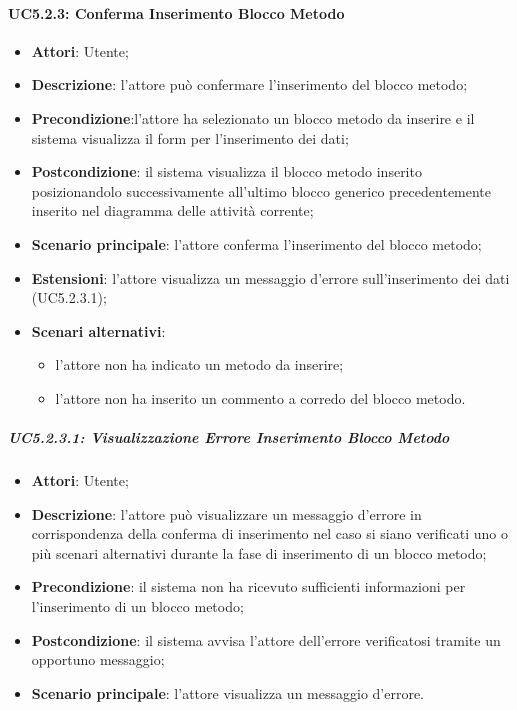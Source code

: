 \paragraph{UC5.2.3: Conferma Inserimento Blocco Metodo}
\label{UC5.2.3}
\begin{itemize}
\item \textbf{Attori}: Utente;
\item \textbf{Descrizione}: l'attore può confermare l'inserimento del blocco metodo;	
\item \textbf{Precondizione}:l'attore ha selezionato un blocco metodo da inserire e il sistema visualizza il form per l'inserimento dei dati;	
\item \textbf{Postcondizione}: il sistema visualizza il blocco metodo inserito posizionandolo successivamente all'ultimo blocco generico precedentemente inserito nel diagramma delle attività corrente;		
\item \textbf{Scenario principale}:
l'attore conferma l'inserimento del blocco metodo;	
\item \textbf{Estensioni}:
l'attore visualizza un messaggio d'errore sull'inserimento dei dati (UC5.2.3.1);	
\item \textbf{Scenari alternativi}:
\begin{itemize}
\item l'attore non ha indicato un metodo da inserire;
\item l'attore non ha inserito un commento a corredo del blocco metodo.
\end{itemize}
\end{itemize}

\subparagraph{UC5.2.3.1: Visualizzazione Errore Inserimento Blocco Metodo}
\label{UC5.2.3.1}
\begin{itemize}
\item \textbf{Attori}: Utente;
\item \textbf{Descrizione}: l'attore può visualizzare un messaggio d'errore in corrispondenza della conferma di inserimento nel caso si siano verificati uno o più scenari alternativi durante la fase di inserimento di un blocco metodo;	
\item \textbf{Precondizione}: il sistema non ha ricevuto sufficienti informazioni per l'inserimento di un blocco metodo;	
\item \textbf{Postcondizione}: il sistema avvisa l'attore dell'errore verificatosi tramite un opportuno messaggio;	
\item \textbf{Scenario principale}:
l'attore visualizza un messaggio d'errore.	
\end{itemize}

